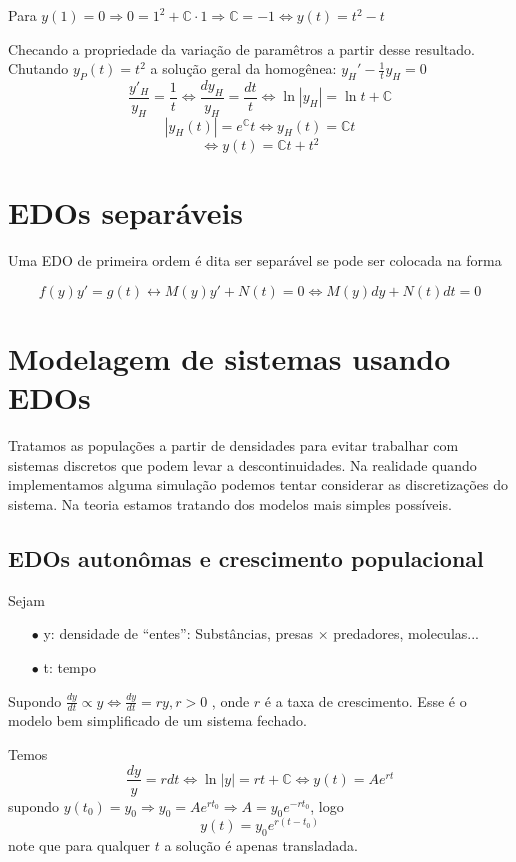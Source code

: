 Para \( y(1) = 0 \Rightarrow 0 = 1^2 + \mathbb{C} \cdot 1 \Rightarrow \mathbb{C} = -1 \Leftrightarrow y(t) = t^2 - t \) 

Checando a propriedade da variação de paramêtros a partir desse resultado.
Chutando \( y_P (t) = t^2 \) a solução geral da homogênea: \( y_{H}' - \frac{1}{t} y_H = 0 \) 
\[ \frac{y'_{H}}{y_{H}} = \frac{1}{t} \Leftrightarrow \frac{d y_{H}}{y_{H}} = \frac{dt}{t} \Leftrightarrow \ln|y_H| = \ln t + \mathbb{C}  \]
\[  |y_H(t)| = e^{\mathbb{C}} t \Leftrightarrow y_H(t) = \mathbb{C} t \]
\[ \Leftrightarrow y(t) = \mathbb{C} t + t^2  \]

\section{EDOs separáveis}
Uma EDO de primeira ordem é dita ser separável se pode ser colocada na forma

\begin{equation}
  f(y) y' = g(t) \leftrightarrow M(y)y' + N(t) = 0 \Leftrightarrow M(y) dy + N(t) dt = 0
  \label{eq:edo_separavel}
\end{equation}

\section{Modelagem de sistemas usando EDOs}
Tratamos as populações a partir de densidades para evitar trabalhar com sistemas discretos que podem
levar a descontinuidades. Na realidade quando implementamos alguma simulação podemos tentar
considerar as discretizações do sistema. Na teoria estamos tratando dos modelos mais simples
possíveis.
\subsection{EDOs autonômas e crescimento populacional}
Sejam
\begin{itemize}
 \item[$\bullet$] y: densidade de ``entes'': Substâncias, presas $\times$ predadores, moleculas...
 \item[$\bullet$] t: tempo
\end{itemize}

Supondo \( \frac{dy}{dt} \propto y \Leftrightarrow \frac{dy}{dt}=  r y, r > 0 \) , onde \( r \) é a taxa de
crescimento. Esse é o modelo bem simplificado de um sistema fechado.

Temos
\[ \frac{dy}{y}= r dt \Leftrightarrow \ln | y| = rt + \mathbb{C} \Leftrightarrow y(t) = A e^{rt}\]
supondo \( y(t_0) = y_0 \Rightarrow y_0 = A e^{rt_0} \Rightarrow A = y_0 e^{-rt_0} \), logo
\[ y(t) = y_0 e^{r(t-t_0)} \]
note que para qualquer \( t \) a solução é apenas transladada.

